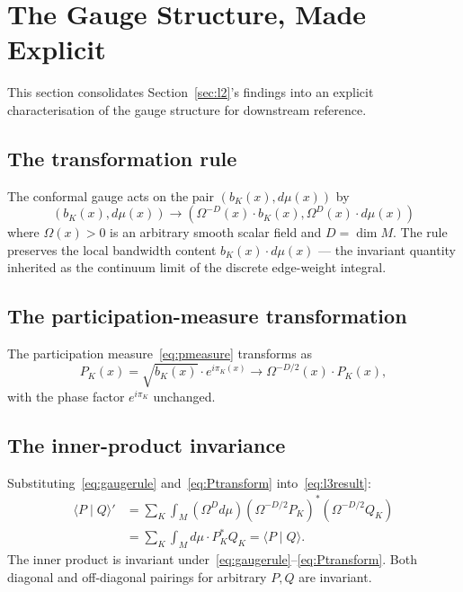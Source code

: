 \documentclass[11pt,a4paper]{article}
\begin{document}
\section{The Gauge Structure, Made Explicit}\label{sec:gauge}

This section consolidates Section~\ref{sec:l2}'s findings into an explicit characterisation of the gauge structure for downstream reference.

\subsection{The transformation rule}

The conformal gauge acts on the pair $(b_K(x), d\mu(x))$ by
\begin{equation}
(b_K(x), d\mu(x)) \to (\Omega^{-D}(x) \cdot b_K(x), \Omega^D(x) \cdot d\mu(x))
\label{eq:gaugerule}
\end{equation}
where $\Omega(x) > 0$ is an arbitrary smooth scalar field and $D = \dim M$. The rule preserves the local bandwidth content $b_K(x) \cdot d\mu(x)$ --- the invariant quantity inherited as the continuum limit of the discrete edge-weight integral.

\subsection{The participation-measure transformation}

The participation measure~\eqref{eq:pmeasure} transforms as
\begin{equation}
P_K(x) = \sqrt{b_K(x)} \cdot e^{i \pi_K(x)} \to \Omega^{-D/2}(x) \cdot P_K(x),
\label{eq:Ptransform}
\end{equation}
with the phase factor $e^{i \pi_K}$ unchanged.

\subsection{The inner-product invariance}

Substituting~\eqref{eq:gaugerule} and~\eqref{eq:Ptransform} into~\eqref{eq:l3result}:
\begin{align}
\langle P \mid Q \rangle' &= \sum_K \int_M (\Omega^D d\mu) (\Omega^{-D/2} P_K)^* (\Omega^{-D/2} Q_K) \nonumber \\
&= \sum_K \int_M d\mu \cdot P_K^* Q_K = \langle P \mid Q \rangle.
\label{eq:gaugeinv}
\end{align}
The inner product is invariant under~\eqref{eq:gaugerule}--\eqref{eq:Ptransform}. Both diagonal and off-diagonal pairings for arbitrary $P, Q$ are invariant.
\end{document}
